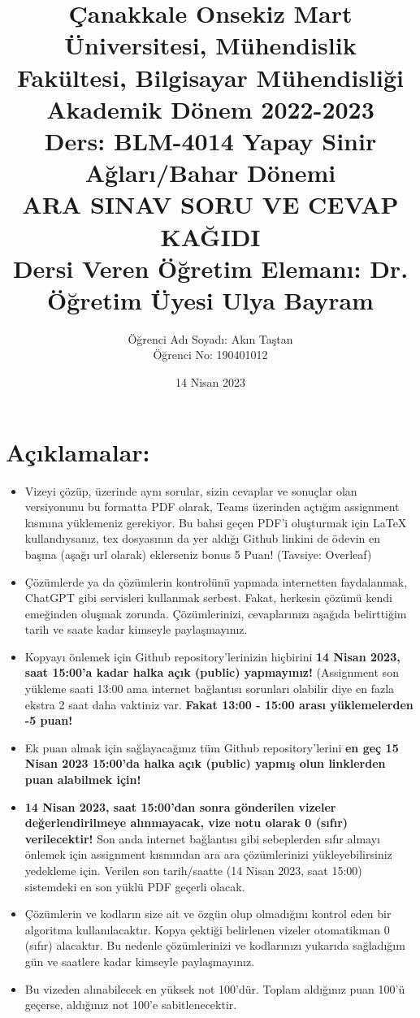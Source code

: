 \documentclass[11pt]{article}
\title{Çanakkale Onsekiz Mart Üniversitesi, Mühendislik Fakültesi, Bilgisayar Mühendisliği Akademik Dönem 2022-2023\\
Ders: BLM-4014 Yapay Sinir Ağları/Bahar Dönemi\\ 
ARA SINAV SORU VE CEVAP KAĞIDI\\
Dersi Veren Öğretim Elemanı: Dr. Öğretim Üyesi Ulya Bayram}
\author{%
\begin{minipage}{\textwidth}
\raggedright
Öğrenci Adı Soyadı: Akın Taştan\\ %
Öğrenci No: 190401012
\end{minipage}%
}
\date{14 Nisan 2023}
\begin{document}
\maketitle

\vspace{-.5in}
\section*{Açıklamalar:}
\begin{itemize}
    \item Vizeyi çözüp, üzerinde aynı sorular, sizin cevaplar ve sonuçlar olan versiyonunu bu formatta PDF olarak, Teams üzerinden açtığım assignment kısmına yüklemeniz gerekiyor. Bu bahsi geçen PDF'i oluşturmak için LaTeX kullandıysanız, tex dosyasının da yer aldığı Github linkini de ödevin en başına (aşağı url olarak) eklerseniz bonus 5 Puan! (Tavsiye: Overleaf)
    \item Çözümlerde ya da çözümlerin kontrolünü yapmada internetten faydalanmak, ChatGPT gibi servisleri kullanmak serbest. Fakat, herkesin çözümü kendi emeğinden oluşmak zorunda. Çözümlerinizi, cevaplarınızı aşağıda belirttiğim tarih ve saate kadar kimseyle paylaşmayınız. 
    \item Kopyayı önlemek için Github repository'lerinizin hiçbirini \textbf{14 Nisan 2023, saat 15:00'a kadar halka açık (public) yapmayınız!} (Assignment son yükleme saati 13:00 ama internet bağlantısı sorunları olabilir diye en fazla ekstra 2 saat daha vaktiniz var. \textbf{Fakat 13:00 - 15:00 arası yüklemelerden -5 puan!}
    \item Ek puan almak için sağlayacağınız tüm Github repository'lerini \textbf{en geç 15 Nisan 2023 15:00'da halka açık (public) yapmış olun linklerden puan alabilmek için!}
    \item \textbf{14 Nisan 2023, saat 15:00'dan sonra gönderilen vizeler değerlendirilmeye alınmayacak, vize notu olarak 0 (sıfır) verilecektir!} Son anda internet bağlantısı gibi sebeplerden sıfır almayı önlemek için assignment kısmından ara ara çözümlerinizi yükleyebilirsiniz yedekleme için. Verilen son tarih/saatte (14 Nisan 2023, saat 15:00) sistemdeki en son yüklü PDF geçerli olacak.
    \item Çözümlerin ve kodların size ait ve özgün olup olmadığını kontrol eden bir algoritma kullanılacaktır. Kopya çektiği belirlenen vizeler otomatikman 0 (sıfır) alacaktır. Bu nedenle çözümlerinizi ve kodlarınızı yukarıda sağladığım gün ve saatlere kadar kimseyle paylaşmayınız.
    \item Bu vizeden alınabilecek en yüksek not 100'dür. Toplam aldığınız puan 100'ü geçerse, aldığınız not 100'e sabitlenecektir.

\end{itemize}
\end{document}
